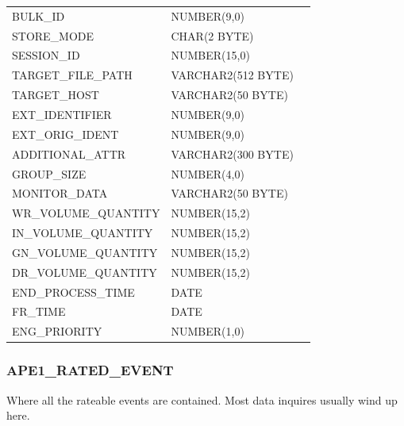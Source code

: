 \documentclass[12pt,twoside]{article}
\begin{document}
\begin{longtable}{lll}
 BULK\_ID                      &  NUMBER(9,0)         &               \\
 STORE\_MODE                   &  CHAR(2 BYTE)        &               \\
 SESSION\_ID                   &  NUMBER(15,0)        &               \\
 TARGET\_FILE\_PATH            &  VARCHAR2(512 BYTE)  &               \\
 TARGET\_HOST                  &  VARCHAR2(50 BYTE)   &               \\
 EXT\_IDENTIFIER               &  NUMBER(9,0)         &               \\
 EXT\_ORIG\_IDENT              &  NUMBER(9,0)         &               \\
 ADDITIONAL\_ATTR              &  VARCHAR2(300 BYTE)  &               \\
 GROUP\_SIZE                   &  NUMBER(4,0)         &               \\
 MONITOR\_DATA                 &  VARCHAR2(50 BYTE)   &               \\
 WR\_VOLUME\_QUANTITY          &  NUMBER(15,2)        &               \\
 IN\_VOLUME\_QUANTITY          &  NUMBER(15,2)        &               \\
 GN\_VOLUME\_QUANTITY          &  NUMBER(15,2)        &               \\
 DR\_VOLUME\_QUANTITY          &  NUMBER(15,2)        &               \\
 END\_PROCESS\_TIME            &  DATE                &               \\
 FR\_TIME                      &  DATE                &               \\
 ENG\_PRIORITY                 &  NUMBER(1,0)         &               \\
\hline
\end{longtable}

\normalsize

\newpage
\subsubsection{APE1\_RATED\_EVENT}
\label{sec-8-3-3}

    Where all the rateable events are contained. Most data inquires
    usually wind up here.
\end{document}
